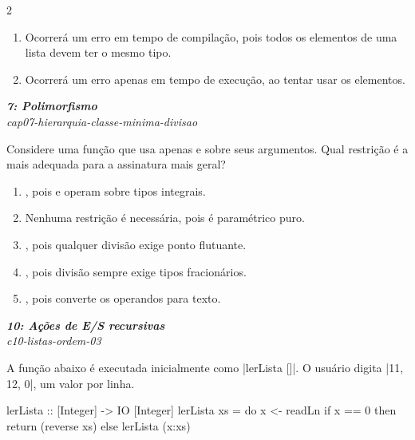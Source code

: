 \documentclass[a4paper,10pt,brazil]{article}
\begin{document}
\begin{multicols}{2}
\begin{enumerate}
  \item Ocorrerá um erro em tempo de compilação, pois todos os elementos de uma lista devem ter o mesmo tipo.

  \item Ocorrerá um erro apenas em tempo de execução, ao tentar usar os elementos.


\end{enumerate}

\begin{flushright}
  \footnotesize
  \textit{\textbf{7: Polimorfismo}}\\
  \textit{cap07-hierarquia-classe-minima-divisao}\\

\end{flushright}
Considere uma função que usa apenas  e  sobre seus argumentos. Qual restrição é a mais adequada para a assinatura mais geral?
\begin{enumerate}
  \item {}, pois  e  operam sobre tipos integrais.
  \item Nenhuma restrição é necessária, pois  é paramétrico puro.
  \item {}, pois qualquer divisão exige ponto flutuante.
  \item {}, pois divisão sempre exige tipos fracionários.
  \item {}, pois  converte os operandos para texto.

\end{enumerate}

\begin{flushright}
  \footnotesize
  \textit{\textbf{10: Ações de E/S recursivas}}\\
  \textit{c10-listas-ordem-03}\\

\end{flushright}
A função abaixo é executada inicialmente como \haskellinline|lerLista []|. O usuário digita \haskellinline|11, 12, 0|, um valor por linha.

\begin{haskellcode}
lerLista :: [Integer] -> IO [Integer]
lerLista xs = do
  x <- readLn
  if x == 0
    then return (reverse xs)
    else lerLista (x:xs)
\end{haskellcode}


\end{multicols}
\end{document}
